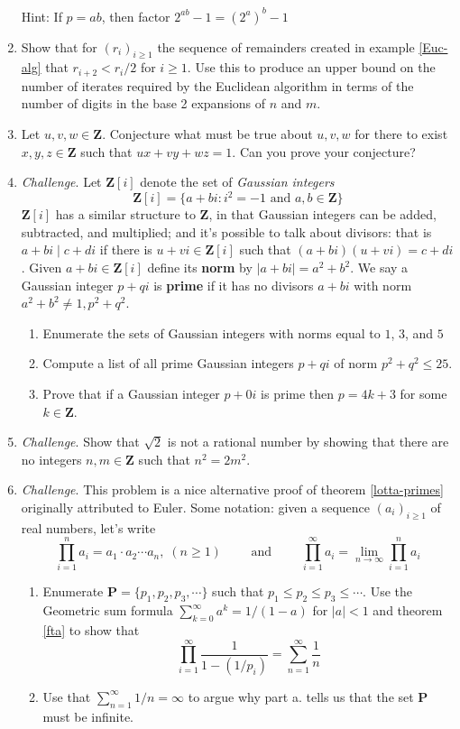 \documentclass[12pt]{article}
\numberwithin{equation}{subsection}
\theoremstyle{note}
\begin{document}
\begin{enumerate}[label=\arabic*.]
	{\color{violet} Hint: If $p=ab$, then factor $2^{ab}-1=(2^a)^b-1$}
	
	\item \label{gcd-speed} Show that for $(r_i)_{i\geq 1}$ the sequence of remainders created in example \ref{Euc-alg} that $r_{i+2}< r_i/2$ for $i\geq 1$. Use this to produce an upper bound on the number of iterates required by the Euclidean algorithm in terms of the number of digits in the base 2 expansions of $n$ and $m$.
	
	\item Let $u,v,w\in\mathbf{Z}$. Conjecture what must be true about $u,v,w$ for there to exist $x,y,z\in\mathbf{Z}$ such that $ux+vy+wz=1$. Can you prove your conjecture?
	
	\item \textit{Challenge}. Let $\mathbf{Z}[i]$ denote the set of \textit{Gaussian integers} \[ \mathbf{Z}[i]=\{ a+bi : i^2=-1 \text{ and } a,b\in \mathbf{Z}\} \]
	$\mathbf{Z}[i]$ has a similar structure to $\mathbf{Z}$, in that Gaussian integers can be added, subtracted, and multiplied; and it's possible to talk about divisors: that is $a+bi \mid c+di$ if there is $u+vi\in\mathbf{Z}[i]$ such that $(a+bi)(u+vi)=c+di$. Given $a+bi\in\mathbf{Z}[i]$ define its \textbf{norm} by $|a+bi|=a^2+b^2$. We say a Gaussian integer $p+qi$ is \textbf{prime} if it has no divisors $a+bi$ with norm $a^2+b^2\neq 1, p^2+q^2$. 
	
	 \begin{enumerate}
	 	\item Enumerate the sets of Gaussian integers with norms equal to $1$, $3$, and $5$
	 	\item Compute a list of all prime Gaussian integers $p+qi$ of norm $p^2+q^2 \leq 25$. 
		\item Prove that if a Gaussian integer $p+0i$ is prime then $p=4k+3$ for some $k\in\mathbf{Z}$. 
	\end{enumerate}
	
	
	\item \textit{Challenge}. Show that $\sqrt{2}$ is not a rational number by showing that there are no integers $n,m\in\mathbf{Z}$ such that $n^2=2m^2$. 
	
	\item \textit{Challenge}. This problem is a nice alternative proof of theorem \ref{lotta-primes} originally attributed to Euler. Some notation: given a sequence $(a_i)_{i\geq 1}$ of real numbers, let's write \[ \prod_{i=1}^n a_i = a_1\cdot a_2 \cdots a_n, \; (n\geq 1) \qquad \text{ and } \qquad \prod_{i=1}^{\infty} a_i = \lim_{n\to \infty} \prod_{i=1}^n a_i \]
	\begin{enumerate}
		\item Enumerate $\mathbf{P}=\{p_1,p_2,p_3,\cdots\}$ such that $p_1\leq p_2\leq p_3 \leq \cdots $. Use the Geometric sum formula $\sum_{k=0}^{\infty} a^k = 1/(1-a)$ for $|a|<1$ and theorem \ref{fta} to show that \[ \prod_{i=1}^{\infty} \dfrac{1}{1-(1/p_i)} =\sum_{n=1}^{\infty} \dfrac{1}{n} \]
		\item Use that $\sum_{n=1}^{\infty} 1/n=\infty$ to argue why part a. tells us that the set $\mathbf{P}$ must be infinite.	
	\end{enumerate}
	

\end{enumerate}
\end{document}
